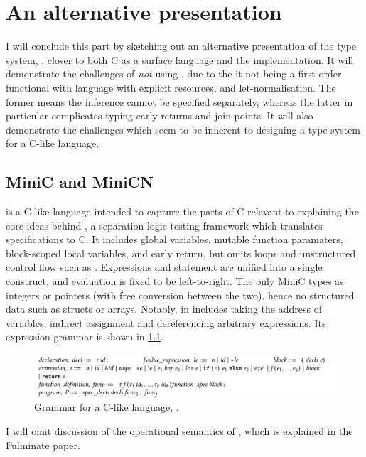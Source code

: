 \chapter{An alternative presentation}\label{chap:kernel-alternative}

I will conclude this part by sketching out an alternative presentation of the
 type system, , closer to both C as a surface language and
the  implementation. It will demonstrate the challenges of \emph{not}
using , due to the it not being a first-order functional with
language with explicit resources, and let-normalisation. The former means the
inference cannot be specified separately, whereas the latter in particular
complicates typing early-returns and join-points. It will also demonstrate the
challenges which seem to be inherent to designing a type system for a C-like
language.

\section{MiniC and MiniCN}

 is a C-like language intended to capture the parts of C relevant to
explaining the core ideas behind
, a separation-logic testing
framework which translates  specifications to C. It includes global
variables, mutable function paramaters, block-scoped local variables, and early
return, but omits loops and unstructured control flow such as .
Expressions and statement are unified into a single construct, and evaluation
is fixed to be left-to-right. The only MiniC types as integers or pointers
(with free conversion between the two), hence no structured data such as
structs or arrays. Notably, in  includes taking the address of
variables, indirect assignment and dereferencing arbitrary expressions. Its
expression grammar is shown in \cref{fig:minic-grammar}.

\begin{figure}[tp]
    \includegraphics{figures/mini-c-grammar}
    \caption{Grammar for a C-like language, .}\label{fig:minic-grammar}
\end{figure}

I will omit discussion of the operational semantics of , which is
explained in the Fulminate paper.

